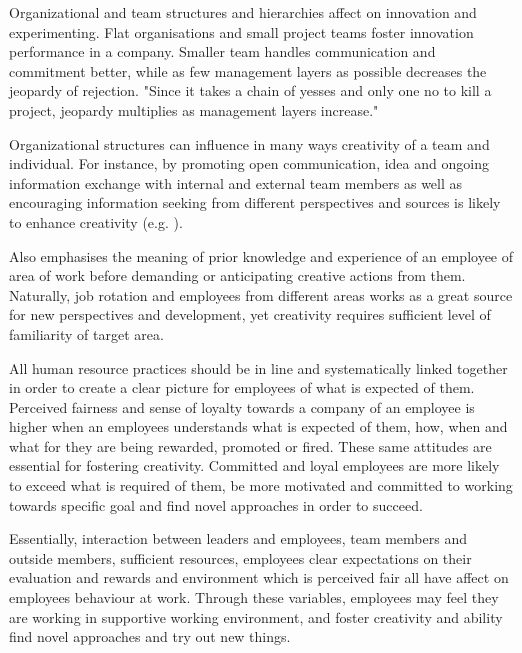 Organizational and team structures and hierarchies affect on innovation and experimenting. Flat organisations and small project teams foster innovation performance in a company. Smaller team handles communication and commitment better, while as few management layers as possible decreases the jeopardy of rejection. "Since it takes a chain of yesses and only one no to kill a project, jeopardy multiplies as management layers increase."\citep{quinn1985managing}

Organizational structures can influence in many ways creativity of a team and individual. For instance, by promoting open communication, idea and ongoing information exchange with internal and external team members as well as encouraging information seeking from different perspectives and sources is likely to enhance creativity (e.g. \citep{ancona1992demography,dougherty1996sustained}). 

Also \citet{shalley2004leaders} emphasises the meaning of prior knowledge and experience of an employee of area of work before demanding or anticipating creative actions from them. Naturally, job rotation and employees from different areas works as a great source for new perspectives and development, yet creativity requires sufficient level of familiarity of target area. \citep{shalley2004leaders}

All human resource practices should be in line and systematically linked together in order to create a clear picture for employees of what is expected of them. Perceived fairness and sense of loyalty towards a company of an employee is higher when an employees understands what is expected of them, how, when and what for they are being rewarded, promoted or fired. These same attitudes are essential for fostering creativity. Committed and loyal employees are more likely to exceed what is required of them, be more motivated and committed to working towards specific goal and find novel approaches in order to succeed. \citep{shalley2004leaders}

Essentially, interaction between leaders and employees, team members and outside members, sufficient resources, employees clear expectations on their evaluation and rewards and environment which is perceived fair all have affect on employees behaviour at work. Through these variables, employees may feel they are working in supportive working environment, and foster creativity and ability find novel approaches and try out new things. \citep{shalley2004leaders}

